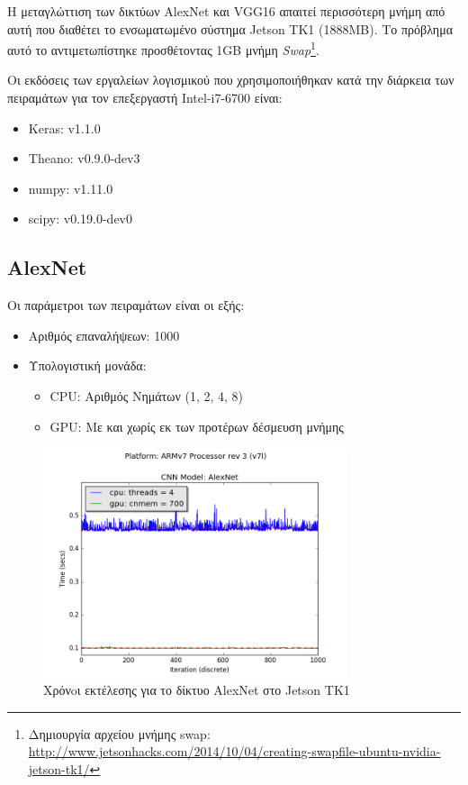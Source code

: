Η μεταγλώττιση των δικτύων AlexNet και VGG16 απαιτεί περισσότερη
μνήμη από αυτή που διαθέτει το ενσωματωμένο σύστημα Jetson TK1 (1888MB).
Το πρόβλημα αυτό το αντιμετωπίστηκε προσθέτοντας 1GB μνήμη
\emph{Swap}\footnote{Δημιουργία αρχείου μνήμης swap: \url{http://www.jetsonhacks.com/2014/10/04/creating-swapfile-ubuntu-nvidia-jetson-tk1/}}.

Οι εκδόσεις των εργαλείων λογισμικού που χρησιμοποιήθηκαν
κατά την διάρκεια των πειραμάτων για τον επεξεργαστή Intel-i7-6700 είναι:
\begin{itemize}
  \item{Keras: v1.1.0}
  \item{Theano: v0.9.0-dev3}
  \item{numpy: v1.11.0}
  \item{scipy: v0.19.0-dev0}
\end{itemize}


\subsection{AlexNet}

Οι παράμετροι των πειραμάτων είναι οι εξής:
\begin{itemize}
  \item{Αριθμός επαναλήψεων: 1000}
  \item{Υπολογιστική μονάδα:}
    \begin{itemize}
      \item{CPU: Αριθμός Νημάτων (1, 2, 4, 8)}
      \item{GPU: Με και χωρίς εκ των προτέρων δέσμευση μνήμης}
    \end{itemize}
\end{itemize}

\begin{figure}[H]
  \centering
  \includegraphics[width=0.8\textwidth]{./images/chapter6/benchmark_alexnet_jetson.png}
  \caption[Χρόνoι εκτέλεσης για το δίκτυο AlexNet στο Jetson TK1]{Χρόνoι εκτέλεσης για το δίκτυο AlexNet στο Jetson TK1}
  \label{fig:alexnet_results_jetson}
\end{figure}

